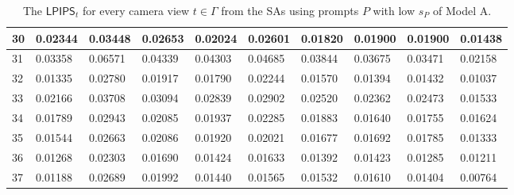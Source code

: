 \begin{table}[H]
{\begin{tabular}{|l|l|l|l|l|l|l|l|l|l|}
        30 & 0.02344 & 0.03448 & 0.02653 & 0.02024 & 0.02601 & 0.01820 & 0.01900 & 0.01900 & 0.01438 \\ \hline
        31 & 0.03358 & 0.06571 & 0.04339 & 0.04303 & 0.04685 & 0.03844 & 0.03675 & 0.03471 & 0.02158 \\ \hline
        32 & 0.01335 & 0.02780 & 0.01917 & 0.01790 & 0.02244 & 0.01570 & 0.01394 & 0.01432 & 0.01037 \\ \hline
        33 & 0.02166 & 0.03708 & 0.03094 & 0.02839 & 0.02902 & 0.02520 & 0.02362 & 0.02473 & 0.01533 \\ \hline
        34 & 0.01789 & 0.02943 & 0.02085 & 0.01937 & 0.02285 & 0.01883 & 0.01640 & 0.01755 & 0.01624 \\ \hline
        35 & 0.01544 & 0.02663 & 0.02086 & 0.01920 & 0.02021 & 0.01677 & 0.01692 & 0.01785 & 0.01333 \\ \hline
        36 & 0.01268 & 0.02303 & 0.01690 & 0.01424 & 0.01633 & 0.01392 & 0.01423 & 0.01285 & 0.01211 \\ \hline
        37 & 0.01188 & 0.02689 & 0.01992 & 0.01440 & 0.01565 & 0.01532 & 0.01610 & 0.01404 & 0.00764 \\ \hline
    \end{tabular}}
	\caption{The $ \mathsf{LPIPS}_t$ for every camera view $t \in \varGamma$ from the SAs using prompts $P$ with low $s_P$ of Model A.}
\end{table}

